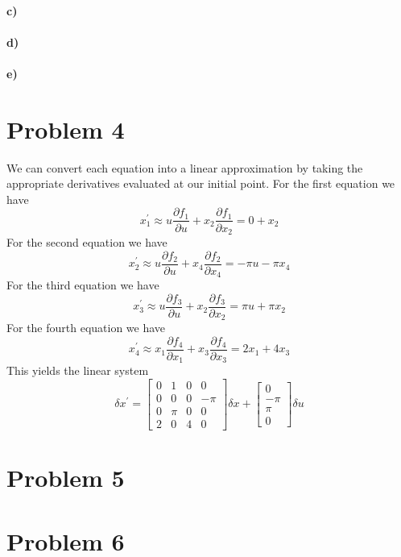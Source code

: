\documentclass[12pt]{article}
\begin{document}
\paragraph{c)}

\paragraph{d)}

\paragraph{e)}

\section*{Problem 4}

We can convert each equation into a linear approximation by taking the appropriate derivatives evaluated at our initial point.
For the first equation we have
\[x_1^\prime \approx u\frac{\partial f_1}{\partial u} + x_2\frac{\partial f_1}{\partial x_2}=0 + x_2\]
For the second equation we have
\[x_2^\prime \approx u\frac{\partial f_2}{\partial u} + x_4\frac{\partial f_2}{\partial x_4}=-\pi u - \pi x_4\]
For the third equation we have
\[x_3^\prime \approx u\frac{\partial f_3}{\partial u} + x_2\frac{\partial f_3}{\partial x_2}=\pi u + \pi x_2\]
For the fourth equation we have
\[x_4^\prime \approx x_1\frac{\partial f_4}{\partial x_1} + x_3\frac{\partial f_4}{\partial x_3}=2x_1 + 4x_3\]
This yields the linear system
\[\delta x^\prime = \begin{bmatrix}
    0 & 1 & 0 & 0\\
    0 & 0 & 0 & -\pi\\
    0 & \pi & 0 & 0\\
    2 & 0 & 4 & 0
\end{bmatrix}\delta x + \begin{bmatrix}
    0\\
    -\pi\\
    \pi\\
    0
\end{bmatrix}\delta u\]

\section*{Problem 5}

\section*{Problem 6}
\end{document}

